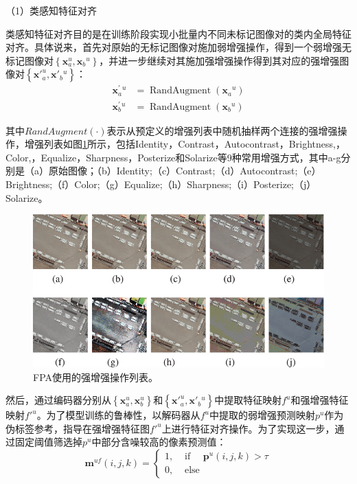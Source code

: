 \documentclass[lang=chs, degree=master, blindreview=false, adobe=false]{yanputhesis}
\begin{document}
（1）类感知特征对齐

类感知特征对齐目的是在训练阶段实现小批量内不同未标记图像对的类内全局特征对齐。具体说来，首先对原始的无标记图像对施加弱增强操作，得到一个弱增强无标记图像对$\left\{\mathbf{x}_{a}^{u}, \mathbf{x}_{b}{ }^{u}\right\}$，并进一步继续对其施加强增强操作得到其对应的强增强图像对$\left\{\mathbf{x'}_{a}^{u}, \mathbf{x'}_{b}{ }^{u}\right\}$：
\begin{equation}
  \label{eq:FPAaug}
  \begin{aligned}
    \mathbf{x}_{a}^{\prime}{ }^{u} & =\operatorname{RandAugment}\left(\mathbf{x}_{a}{ }^{u}\right) \\
    \mathbf{x}_{b}^{\prime}{ }^{u} & =\operatorname{RandAugment}\left(\mathbf{x}_{b}{ }^{u}\right)
  \end{aligned}
\end{equation}

其中$RandAugment(\cdot)$表示从预定义的增强列表中随机抽样两个连接的强增强操作，增强列表如图\ref{fig:FPAstrongAug}所示，包括Identity，Contrast，Autocontrast，Brightness,，Color,，Equalize，Sharpness，Posterize和Solarize等9种常用增强方式，其中a-g分别是（a）原始图像；（b）Identity;（c）Contrast;（d）Autocontrast;（e）Brightness;（f）Color;（g）Equalize;（h）Sharpness;（i）Posterize;（j）Solarize。
\begin{figure}[htb]
  \centering
  \includegraphics[scale=0.55]{images/Strong_aug.png}
  \caption{
    FPA使用的强增强操作列表\cite{Zhang2023FPA}。
  }
  \label{fig:FPAstrongAug}
\end{figure}

然后，通过编码器分别从$\left\{\mathbf{x}_{a}^{u}, \mathbf{x}_{b}^{u}\right\}$和$\left\{\mathbf{x'}_{a}^{u}, \mathbf{x'}_{b}{ }^{u}\right\}$中提取特征映射$f^u$和强增强特征映射$f'^u$。为了模型训练的鲁棒性，以解码器从$f^u$中提取的弱增强预测映射$p^u$作为伪标签参考，指导在强增强特征图$f'^u$上进行特征对齐操作。为了实现这一步，通过固定阈值筛选掉$p^u$中部分含噪较高的像素预测值：
\begin{equation}
  \label{eq:FPAthresh}
  \mathbf{m}^{u f}(i, j, k)=\left\{\begin{array}{ll}
    1, & \text { if } \quad \mathbf{p}^{u}(i, j, k)>\tau \\
    0, & \text { else }
    \end{array}\right.
\end{equation}
\end{document}
